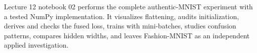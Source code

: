 \begin{notebooklink}
Lecture 12 notebook 02 performs the complete authentic-MNIST experiment with a
tested NumPy implementation. It visualizes flattening, audits initialization,
derives and checks the fused loss, trains with mini-batches, studies confusion
patterns, compares hidden widths, and leaves Fashion-MNIST as an independent
applied investigation.
\end{notebooklink}
